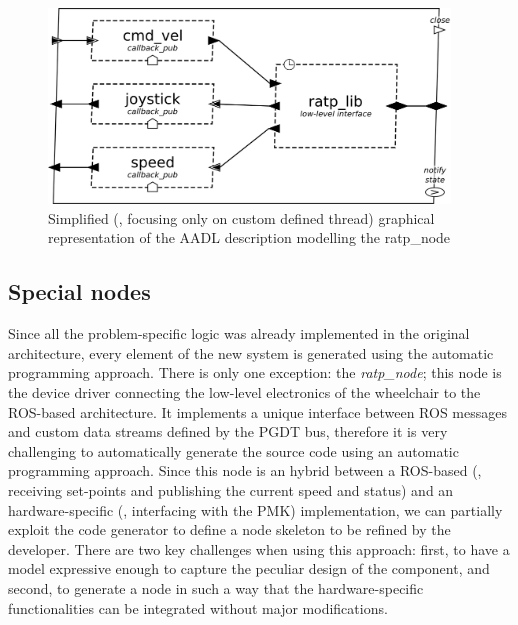 \begin{figure}[t]
\centering
\includegraphics[width=0.95\textwidth]{gfx/pmk/ratp}
\caption[Simplified graphical representation of the AADL description modelling the ratp\_node]{Simplified (\ie, focusing only on custom defined thread) graphical representation of the AADL description modelling the ratp\_node}
\label{fig:pmk-ratp}
\end{figure}

\subsection{Special nodes}
\label{sec:special-node}
Since all the problem-specific logic was already implemented in the original architecture, every element of the new system is generated using the automatic programming approach. There is only one exception: the \textit{ratp\_node}; this node is the device driver connecting the low-level electronics of the wheelchair to the ROS-based architecture. It implements a unique interface between ROS messages and custom data streams defined by the PGDT bus, therefore it is very challenging to automatically generate the source code using an automatic programming approach. Since this node is an hybrid between a ROS-based (\ie, receiving set-points and publishing the current speed and status) and an hardware-specific (\ie, interfacing with the PMK) implementation, we can partially exploit the code generator to define a node skeleton to be refined by the developer. There are two key challenges when using this approach: first, to have a model expressive enough to capture the peculiar design of the component, and second, to generate a node in such a way that the hardware-specific functionalities can be integrated without major modifications.

